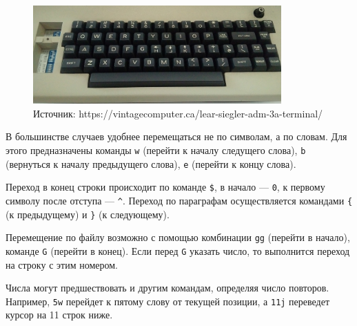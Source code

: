 \documentclass[listings]{labreport}
\begin{document}
\begin{figure}[H]
  \begin{center}
  \includegraphics[width=0.85\textwidth, bb=0 0 1366 540]{vintagecomputer.ca-ADM3A.jpg}
  \captionsetup{labelformat=empty}
  \caption{\scriptsize Источник: https://vintagecomputer.ca/lear-siegler-adm-3a-terminal/}
  \end{center}
\end{figure}

В большинстве случаев удобнее перемещаться не по символам, а по словам. Для этого предназначены
команды \texttt{w} (перейти к началу следущего слова), \texttt{b} (вернуться к началу
предыдущего слова), \texttt{e} (перейти к концу слова).

Переход в конец строки происходит по команде \texttt{\$}, в начало — \texttt{0},
к первому символу после отступа — \texttt{\^{}}. Переход по параграфам осуществляется
командами \texttt{\{} (к предыдущему) и \texttt{\}} (к следующему).

Перемещение по файлу возможно с помощью комбинации \texttt{gg} (перейти в начало), команде
\texttt{G} (перейти в конец). Если перед \texttt{G} указать число, то выполнится переход на строку
с этим номером.

Числа могут предшествовать и другим командам, определяя число повторов. Например, \texttt{5w} перейдет
к пятому слову от текущей позиции, а \texttt{11j} переведет курсор на 11 строк ниже.
\end{document}
